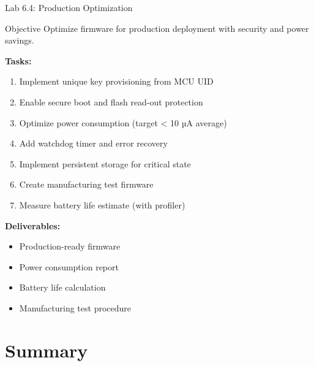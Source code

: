 \documentclass{beamer}
\begin{document}
\begin{frame}{Lab 6.4: Production Optimization}
\begin{block}{Objective}
Optimize firmware for production deployment with security and power savings.
\end{block}

\textbf{Tasks:}
\begin{enumerate}
    \item Implement unique key provisioning from MCU UID
    \item Enable secure boot and flash read-out protection
    \item Optimize power consumption (target < 10 µA average)
    \item Add watchdog timer and error recovery
    \item Implement persistent storage for critical state
    \item Create manufacturing test firmware
    \item Measure battery life estimate (with profiler)
\end{enumerate}

\vspace{0.3cm}

\textbf{Deliverables:}
\begin{itemize}
    \item Production-ready firmware
    \item Power consumption report
    \item Battery life calculation
    \item Manufacturing test procedure
\end{itemize}
\end{frame}

\section{Summary}
\end{document}

